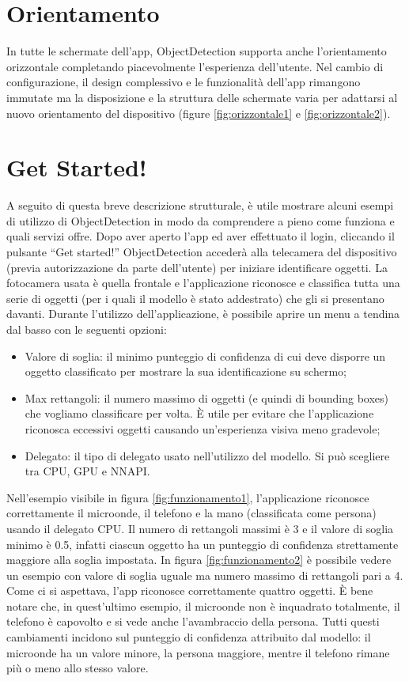 \section{Orientamento}
In tutte le schermate dell’app, ObjectDetection supporta anche l’orientamento orizzontale completando piacevolmente l’esperienza dell’utente.
Nel cambio di configurazione, il design complessivo e le funzionalità dell’app rimangono immutate ma la disposizione e la struttura delle schermate varia
per adattarsi al nuovo orientamento del dispositivo (figure \ref{fig:orizzontale1} e \ref{fig:orizzontale2}).

\section{Get Started!}
A seguito di questa breve descrizione strutturale, è utile mostrare alcuni esempi di utilizzo di ObjectDetection in modo da comprendere a pieno come
funziona e quali servizi offre.
Dopo aver aperto l’app ed aver effettuato il login, cliccando il pulsante “Get started!” ObjectDetection accederà alla telecamera del dispositivo (previa autorizzazione da parte dell'utente) per iniziare 
identificare oggetti.
La fotocamera usata è quella frontale e l’applicazione riconosce e classifica tutta una serie di oggetti (per i quali il modello è stato addestrato) che gli si presentano davanti.
Durante l’utilizzo dell’applicazione, è possibile aprire un menu a tendina dal basso con le seguenti opzioni:
\begin{itemize}
    \item Valore di soglia: il minimo punteggio di confidenza di cui deve disporre un oggetto classificato per mostrare la sua identificazione su schermo;
    \item Max rettangoli: il numero massimo di oggetti (e quindi di bounding boxes) che vogliamo classificare per volta. È utile per evitare che
    l’applicazione riconosca eccessivi oggetti causando un’esperienza visiva meno gradevole;
    \item Delegato: il tipo di delegato usato nell’utilizzo del modello. Si può scegliere tra CPU, GPU e NNAPI.
\end{itemize}
Nell’esempio visibile in figura \ref{fig:funzionamento1}, l’applicazione riconosce correttamente il microonde, il telefono e la mano (classificata come persona) usando il delegato CPU.
Il numero di rettangoli massimi è 3 e il valore di soglia minimo è 0.5, infatti ciascun oggetto ha un punteggio di confidenza strettamente maggiore alla
soglia impostata.
In figura \ref{fig:funzionamento2} è possibile vedere un esempio con valore di soglia uguale ma numero massimo di rettangoli pari a 4.
Come ci si aspettava, l’app riconosce correttamente quattro oggetti.
È bene notare che, in quest’ultimo esempio, il microonde non è inquadrato totalmente, il telefono è capovolto e si vede anche l’avambraccio della persona.
Tutti questi cambiamenti incidono sul punteggio di confidenza attribuito dal modello: il microonde ha un valore minore, la persona maggiore,
mentre il telefono rimane più o meno allo stesso valore.

